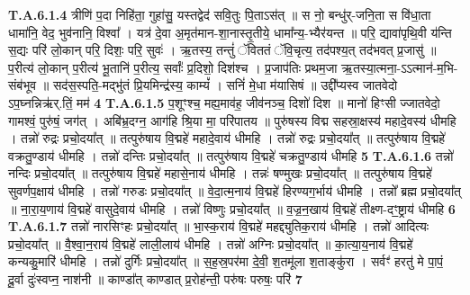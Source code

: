 \documentclass[17pt]{extarticle}
\begin{document}
                  \newline
                                                                  \textbf{ T.A.6.1.4} \newline
                  त्रीणि॑ प॒दा निहि॑ता॒ गुहा॑सु॒ यस्तद्वेद॑ सवि॒तुः पि॒ताऽस॑त् ॥ स नो॒ बन्धु॑र्-जनि॒ता स वि॑धा॒ता धामा॑नि॒ वेद॒ भुव॑नानि॒ विश्वा᳚ । यत्र॑ दे॒वा अ॒मृत॑मान-शा॒नास्तृ॒तीये॒ धामा᳚न्य॒-भ्यैर॑यन्त ॥ परि॒ द्यावा॑पृथि॒वी य॑न्ति स॒द्यः परि॑ लो॒कान् परि॒ दिशः॒ परि॒ सुवः॑ । ऋ॒तस्य॒ तन्तुं॑ ॅविततं ॅवि॒चृत्य॒ तद॑पश्य॒त् तद॑भवत् प्र॒जासु॑ ॥ प॒रीत्य॑ लो॒कान् प॒रीत्य॑ भू॒तानि॑ प॒रीत्य॒ सर्वाः᳚ प्र॒दिशो॒ दिश॑श्च । प्र॒जाप॑तिः प्रथम॒जा ऋ॒तस्या॒त्मना॒-ऽऽत्मान॑-म॒भि-संब॑भूव ॥ सद॑स॒स्पति॒-मद्भु॑तं प्रि॒यमिन्द्र॑स्य॒ काम्यं᳚ । सनिं॑ मे॒धा म॑यासिषं ॥ उद्दी᳚प्यस्व जातवेदो ऽप॒घ्नन्निऋ॑र्.तिं॒ मम॑ \textbf{ 4} \newline
                  \newline
                                                                  \textbf{ T.A.6.1.5} \newline
                  प॒शूꣳश्च॒ मह्य॒माव॑ह॒ जीव॑नञ्च॒ दिशो॑ दिश ॥ मानो॑ हिꣳसी ज्जातवेदो॒ गामश्वं॒ पुरु॑षं॒ जग॑त् ।  अबि॑भ्र॒दग्न॒ आग॑हि श्रि॒या मा॒ परि॑पातय ॥ पुरु॑षस्य विद्म सहस्रा॒क्षस्य॑ महादे॒वस्य॑ धीमहि । तन्नो॑ रुद्रः प्रचो॒दया᳚त् ॥  तत्पुरु॑षाय वि॒द्महे॑ महादे॒वाय॑ धीमहि ।  तन्नो॑ रुद्रः प्रचो॒दया᳚त् ॥  तत्पुरु॑षाय वि॒द्महे॑ वक्रतु॒ण्डाय॑ धीमहि ।  तन्नो॑ दन्तिः प्रचो॒दया᳚त् ॥ तत्पुरु॑षाय वि॒द्महे॑ चक्रतु॒ण्डाय॑ धीमहि \textbf{ 5} \newline
                  \newline
                                                                  \textbf{ T.A.6.1.6} \newline
                  तन्नो॑ नन्दिः प्रचो॒दया᳚त् ॥  तत्पुरु॑षाय वि॒द्महे॑ महासे॒नाय॑ धीमहि ।  तन्नः॑ षण्मुखः प्रचो॒दया᳚त् ॥ तत्पुरु॑षाय वि॒द्महे॑ सुवर्णप॒क्षाय॑ धीमहि । तन्नो॑ गरुडः प्रचो॒दया᳚त् ॥ वे॒दा॒त्म॒नाय॑ वि॒द्महे॑ हिरण्यग॒र्भाय॑ धीमहि । तन्नो᳚ ब्रह्म प्रचो॒दया᳚त् ॥ ना॒रा॒य॒णाय॑ वि॒द्महे॑ वासुदे॒वाय॑ धीमहि ।  तन्नो॑ विष्णुः प्रचो॒दया᳚त् ॥ व॒ज्र॒न॒खाय॑ वि॒द्महे॑ तीक्ष्ण-दꣳ॒॒ष्ट्राय॑ धीमहि \textbf{ 6} \newline
                  \newline
                                                                  \textbf{ T.A.6.1.7} \newline
                  तन्नो॑ नारसिꣳहः प्रचो॒दया᳚त् ॥  भा॒स्क॒राय॑ वि॒द्महे॑ महद्द्युतिक॒राय॑ धीमहि ।  तन्नो॑ आदित्यः प्रचो॒दया᳚त् ॥  वै॒श्वा॒न॒राय॑ वि॒द्महे॑ लाली॒लाय॑ धीमहि ।  तन्नो॑ अग्निः प्रचो॒दया᳚त् ॥  का॒त्या॒य॒नाय॑ वि॒द्महे॑ कन्यकु॒मारि॑ धीमहि ।  तन्नो॑ दुर्गिः प्रचो॒दया᳚त् ॥  स॒ह॒स्र॒पर॑मा दे॒वी॒ श॒तमू॑ला श॒ताङ्कु॑रा ।  सर्वꣳ॑ हरतु॑ मे पा॒पं॒ दू॒र्वा दुः॑स्वप्न॒ नाश॑नी ॥  काण्डा᳚त् काण्डात् प्र॒रोह॑न्ती॒ परु॑षः परुषः॒ परि॑ \textbf{ 7} \newline
\end{document}
